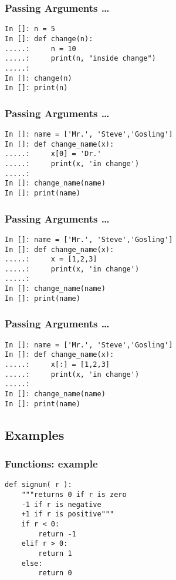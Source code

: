 \documentclass[14pt,compress]{beamer}
\begin{document}
\begin{frame}[fragile]
  \frametitle{Passing Arguments \ldots}
  \begin{lstlisting}
In []: n = 5
In []: def change(n):
.....:     n = 10
.....:     print(n, "inside change")
.....:
In []: change(n)
In []: print(n)
  \end{lstlisting}
\end{frame}

\begin{frame}[fragile]
  \frametitle{Passing Arguments \ldots}
\begin{lstlisting}
In []: name = ['Mr.', 'Steve','Gosling']
In []: def change_name(x):
.....:     x[0] = 'Dr.'
.....:     print(x, 'in change')
.....:
In []: change_name(name)
In []: print(name)
  \end{lstlisting}
\end{frame}

\begin{frame}[fragile]
  \frametitle{Passing Arguments \ldots}
\begin{lstlisting}
In []: name = ['Mr.', 'Steve','Gosling']
In []: def change_name(x):
.....:     x = [1,2,3]
.....:     print(x, 'in change')
.....:
In []: change_name(name)
In []: print(name)
  \end{lstlisting}
\end{frame}

\begin{frame}[fragile]
  \frametitle{Passing Arguments \ldots}
\begin{lstlisting}
In []: name = ['Mr.', 'Steve','Gosling']
In []: def change_name(x):
.....:     x[:] = [1,2,3]
.....:     print(x, 'in change')
.....:
In []: change_name(name)
In []: print(name)
  \end{lstlisting}
\end{frame}


\subsection{Examples}

\begin{frame}[fragile]
  \frametitle{Functions: example}
  \begin{lstlisting}
def signum( r ):
    """returns 0 if r is zero
    -1 if r is negative
    +1 if r is positive"""
    if r < 0:
        return -1
    elif r > 0:
        return 1
    else:
        return 0
  \end{lstlisting}
\end{frame}
\end{document}
